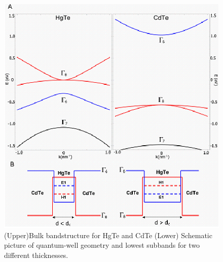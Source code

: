 \documentclass{article}
\begin{document}
\begin{figure}[h]
\centering
\includegraphics[scale=0.60]{80608Fig01.eps}
\caption{(Upper)Bulk bandstructure for HgTe and CdTe (Lower)
Schematic picture of quantum-well geometry and lowest subbands for
two different thicknesses. } \label{bandstructure}
\end{figure}
\end{document}
